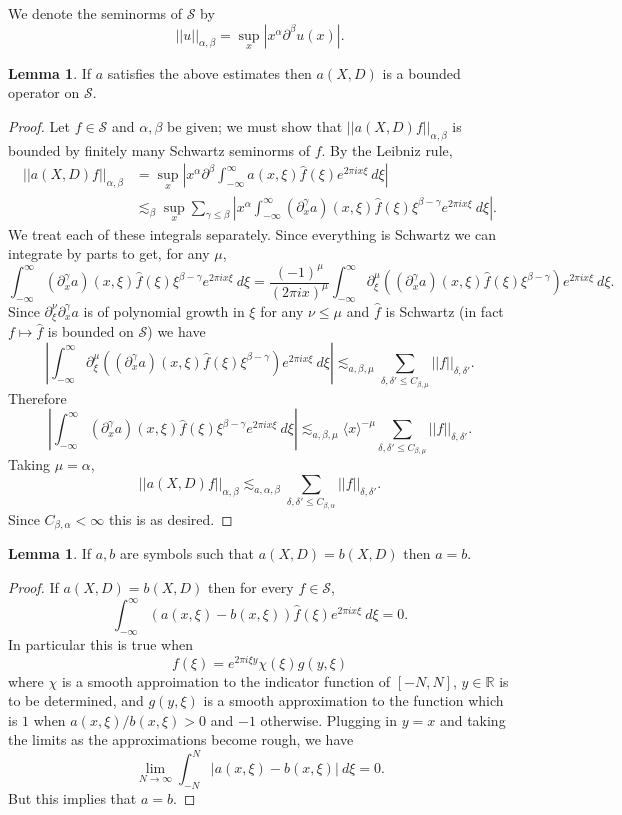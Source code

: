 \documentclass[12pt]{report}
\newcommand{\RR}{\mathbb{R}}
\newcommand{\Sch}{\mathcal{S}}
\theoremstyle{definition}
\newtheorem{lemma}[theorem]{Lemma}
\begin{document}
We denote the seminorms of $\Sch$ by
$$||u||_{\alpha,\beta} = \sup_x |x^\alpha \partial^\beta u(x)|.$$
\begin{lemma}
If $a$ satisfies the above estimates then $a(X, D)$ is a bounded operator on $\Sch$.
\end{lemma}
\begin{proof}
Let $f \in \Sch$ and $\alpha,\beta$ be given; we must show that $||a(X, D)f||_{\alpha,\beta}$ is bounded by finitely many Schwartz seminorms of $f$.
By the Leibniz rule,
\begin{align*}
||a(X,D)f||_{\alpha,\beta} &= \sup_x \left|x^\alpha \partial^\beta \int_{-\infty}^\infty a(x, \xi) \hat f(\xi) e^{2\pi ix\xi} ~d\xi\right|\\
&\lesssim_\beta \sup_x \sum_{\gamma \leq \beta} \left|x^\alpha \int_{-\infty}^\infty (\partial_x^\gamma a)(x, \xi) \hat f(\xi) \xi^{\beta - \gamma} e^{2\pi i x\xi} ~d\xi\right|.
\end{align*}
We treat each of these integrals separately. Since everything is Schwartz we can integrate by parts to get, for any $\mu$,
$$\int_{-\infty}^\infty (\partial_x^\gamma a)(x, \xi) \hat f(\xi) \xi^{\beta - \gamma} e^{2\pi i x\xi} ~d\xi
= \frac{(-1)^\mu}{(2\pi ix)^\mu} \int_{-\infty}^\infty \partial_\xi^\mu((\partial_x^\gamma a)(x, \xi) \hat f(\xi) \xi^{\beta - \gamma}) e^{2\pi ix\xi} ~d\xi.$$
Since $\partial_\xi^\nu \partial_x^\gamma a$ is of polynomial growth in $\xi$ for any $\nu \leq \mu$ and $\hat f$ is Schwartz (in fact $f \mapsto \hat f$ is bounded on $\Sch$) we have
$$\left|\int_{-\infty}^\infty \partial_\xi^\mu((\partial_x^\gamma a)(x, \xi) \hat f(\xi) \xi^{\beta - \gamma}) e^{2\pi ix\xi} ~d\xi\right|
\lesssim_{a,\beta,\mu} \sum_{\delta,\delta' \leq C_{\beta,\mu}} ||f||_{\delta,\delta'}.$$
Therefore
$$\left|\int_{-\infty}^\infty (\partial_x^\gamma a)(x, \xi) \hat f(\xi) \xi^{\beta - \gamma} e^{2\pi i x\xi} ~d\xi\right|
\lesssim_{a,\beta,\mu} \langle x\rangle^{-\mu} \sum_{\delta,\delta' \leq C_{\beta,\mu}} ||f||_{\delta,\delta'}.$$
Taking $\mu = \alpha$,
$$||a(X,D)f||_{\alpha,\beta} \lesssim_{a,\alpha,\beta} \sum_{\delta,\delta' \leq C_{\beta,\alpha}} ||f||_{\delta,\delta'}.$$
Since $C_{\beta,\alpha} < \infty$ this is as desired.
\end{proof}

\begin{lemma}
If $a,b$ are symbols such that $a(X, D) = b(X, D)$ then $a = b$.
\end{lemma}
\begin{proof}
If $a(X, D) = b(X, D)$ then for every $f \in \Sch$,
$$\int_{-\infty}^\infty (a(x, \xi) - b(x, \xi))\hat f(\xi)e^{2\pi i x\xi} ~d\xi = 0.$$
In particular this is true when
$$f(\xi) = e^{2\pi i\xi y}\chi(\xi)g(y, \xi)$$
where $\chi$ is a smooth approimation to the indicator function of $[-N, N]$, $y \in \RR$ is to be determined, and $g(y, \xi)$ is a smooth approximation to the function which is $1$ when $a(x,\xi)/b(x,\xi) > 0$ and $-1$ otherwise. Plugging in $y = x$ and taking the limits as the approximations become rough, we have
$$\lim_{N \to \infty} \int_{-N}^N |a(x, \xi) - b(x, \xi)| ~d\xi = 0.$$
But this implies that $a = b$.
\end{proof}
\end{document}
